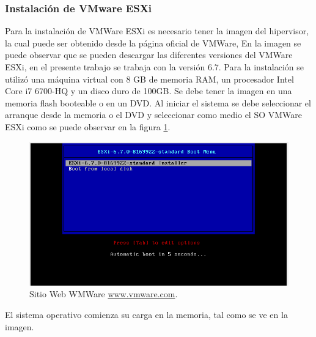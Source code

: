 

\subsubsection{Instalación de VMware ESXi}

Para la instalación de VMWare ESXi es necesario tener la imagen del hipervisor, la cual puede ser obtenido desde la página oficial de VMWare, En la imagen se puede observar que se pueden descargar las diferentes versiones del VMWare ESXi, en el presente trabajo se trabaja con la versión 6.7.
Para la instalación se utilizó una máquina virtual con 8 GB de memoria RAM, un procesador Intel Core i7 6700-HQ y un disco duro de 100GB. Se debe tener la imagen en una memoria flash booteable o en un DVD. Al iniciar el sistema se debe seleccionar el arranque desde la memoria o el DVD y seleccionar como medio el SO VMWare ESXi como se puede observar en la figura \ref{fig:VMwareInstalacion02}.

\begin{figure}[!hbtp]
	\centering
	\includegraphics[width=\linewidth]{RE01_VMwareESXi/RE_VMwareInstalacion02.png}
	\vspace{-0.2cm}
	\caption{Sitio Web WMWare \url{www.vmware.com}.\footnotemark[2]{} }
	\label{fig:VMwareInstalacion02}
\end{figure}

El sistema operativo comienza su carga en la memoria, tal como se ve en la imagen.


